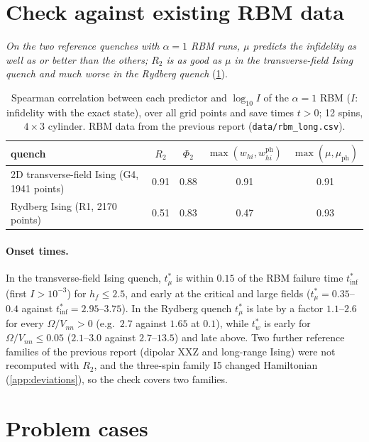 \documentclass[11pt,a4paper]{article}
\newcommand{\tmu}{t^*_\mu}
\newcommand{\tw}{t^*_w}
\newcommand{\whi}{w_{hi}}
\begin{document}
\section{Check against existing RBM data}
\label{app:validation}
\emph{On the two reference quenches with $\alpha=1$ RBM runs, $\mu$ predicts the infidelity as well as or better than the others; $R_2$ is
as good as $\mu$ in the transverse-field Ising quench and much worse in the Rydberg quench} (\cref{tab:rho}).

\begin{table}[h]
\centering\small
\begin{tabular}{lcccc}
  \toprule
  quench & $R_2$ & $\Phi_2$ & $\max(\whi,\whi^{\mathrm{ph}})$ & $\max(\mu,\mu_{\mathrm{ph}})$ \\
  \midrule
  2D transverse-field Ising (G4, 1941 points) & 0.91 & 0.88 & 0.91 & 0.91 \\
  Rydberg Ising (R1, 2170 points) & 0.51 & 0.83 & 0.47 & 0.93 \\
  \bottomrule
\end{tabular}
\caption{Spearman correlation between each predictor and $\log_{10}I$ of the $\alpha=1$ RBM ($I$: infidelity with the
  exact state), over all grid points and save times $t>0$; 12 spins, $4\times3$ cylinder. RBM data from the previous
  report (\texttt{data/rbm\_long.csv}).}
\label{tab:rho}
\end{table}

\paragraph{Onset times.} In the transverse-field Ising quench, $\tmu$ is within $0.15$ of the RBM failure time
$t^*_{\mathrm{inf}}$ (first $I>10^{-3}$) for $h_f\le2.5$, and early at the critical and large fields
($\tmu=0.35$--$0.4$ against $t^*_{\mathrm{inf}}=2.95$--$3.75$). In the Rydberg quench $\tmu$ is late by a factor
$1.1$--$2.6$ for every $\Omega/V_{nn}>0$ (e.g.\ $2.7$ against $1.65$ at $0.1$), while $\tw$ is early for
$\Omega/V_{nn}\le0.05$ ($2.1$--$3.0$ against $2.7$--$13.5$) and late above. Two further reference families of the previous report (dipolar XXZ and long-range Ising) were not
recomputed with $R_2$, and the three-spin family I5 changed Hamiltonian (\cref{app:deviations}), so the check covers two families.

\section{Problem cases}
\label{app:issues}
\end{document}
